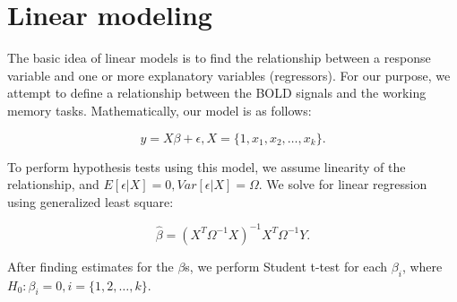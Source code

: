 \section{Linear modeling} 

The basic idea of linear models is to find the relationship between a response 
variable and one or more explanatory variables (regressors). For our purpose, 
we attempt to define a relationship between the BOLD signals and the working 
memory tasks. Mathematically, our model is as follows: 

$$y = X \beta + \epsilon, X = \{1, x_1, x_2, \ldots, x_k\}.$$

To perform hypothesis tests using this model, we assume linearity of the 
relationship, and $E [\epsilon | X ] = 0, Var [ \epsilon | X ] = \Omega$. We 
solve for linear regression using generalized least square: 

$$\hat{\beta} = (X^T \Omega^{-1}X)^{-1} X^T \Omega^{-1} Y.$$ 

After finding estimates for the $\beta$s, we perform Student t-test for each 
$\beta_i$, where $H_0: \beta_i = 0, i = \{1, 2, \ldots, k\}$.
